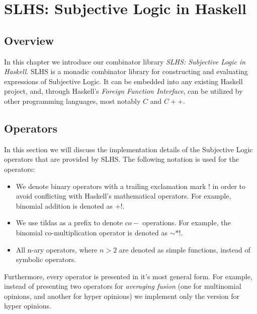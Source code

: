 \documentclass[thesis.tex]{subfiles}
\begin{document}
\chapter{SLHS: Subjective Logic in Haskell}

\section{Overview}

In this chapter we introduce our combinator library \emph{SLHS: Subjective Logic
in Haskell}. SLHS is a monadic combinator library for constructing and evaluating
expressions of Subjective Logic. It can be embedded into any existing Haskell
project, and, through Haskell's \emph{Foreign Function Interface}, can be utilized
by other programming languages, most notably $C$ and $C++$.




%
%













\section{Operators}

In this section we will discuss the implementation details of the Subjective Logic
operators that are provided by SLHS. The following notation is used for the operators:

\begin{itemize}
  \item We denote binary operators with a trailing exclamation mark $!$ in order to
    avoid conflicting with Haskell's mathematical operators. For example, binomial addition
    is denoted as $+!$.
  \item We use tildas as a prefix to denote $co-$ operations. For example, the binomial
    co-multiplication operator is denoted as $\sim *!$.
  \item All n-ary operators, where $n > 2$ are denoted as simple functions, instead of
    symbolic operators.
\end{itemize}

Furthermore, every operator is presented in it's most general form. For example, instead of
presenting two operators for \emph{averaging fusion} (one for multinomial opinions, and another
for hyper opinions) we implement only the version for hyper opinions.








\end{document}
